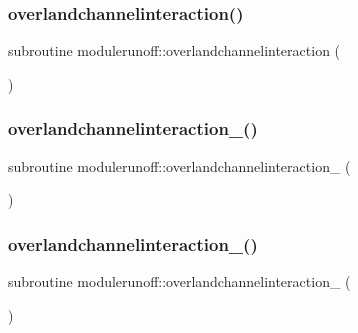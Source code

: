 \subsubsection{\texorpdfstring{overlandchannelinteraction()}{overlandchannelinteraction()}}
{\footnotesize\ttfamily subroutine modulerunoff\+::overlandchannelinteraction (\begin{DoxyParamCaption}{ }\end{DoxyParamCaption})\hspace{0.3cm}{\ttfamily [private]}}

\mbox{\label{namespacemodulerunoff_a83d1f0b3f63668b07444f05e9e5bcf7c}} 
\subsubsection{\texorpdfstring{overlandchannelinteraction\+\_()}{overlandchannelinteraction\_1()}}
{\footnotesize\ttfamily subroutine modulerunoff\+::overlandchannelinteraction\+\_ (\begin{DoxyParamCaption}{ }\end{DoxyParamCaption})\hspace{0.3cm}{\ttfamily [private]}}

\mbox{\label{namespacemodulerunoff_af059c1ee46f4d88ba5904020c0d1edfd}} 
\subsubsection{\texorpdfstring{overlandchannelinteraction\+\_()}{overlandchannelinteraction\_2()}}
{\footnotesize\ttfamily subroutine modulerunoff\+::overlandchannelinteraction\+\_ (\begin{DoxyParamCaption}{ }\end{DoxyParamCaption})\hspace{0.3cm}{\ttfamily [private]}}

